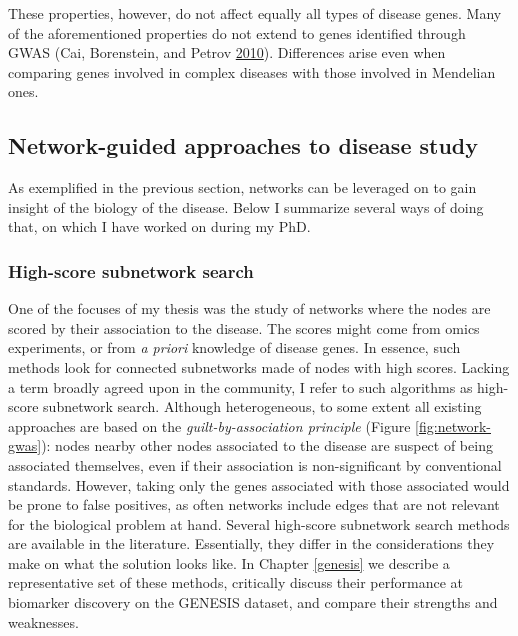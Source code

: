 \documentclass[
  11pt,
]{env/yjiao}
\begin{document}
These properties, however, do not affect equally all types of disease genes. Many of the aforementioned properties do not extend to genes identified through GWAS (Cai, Borenstein, and Petrov \protect\hyperlink{ref-cai_broker_2010}{2010}). Differences arise even when comparing genes involved in complex diseases with those involved in Mendelian ones.

\hypertarget{network-guided-approaches-to-disease-study}{%
\subsection{Network-guided approaches to disease study}\label{network-guided-approaches-to-disease-study}}

As exemplified in the previous section, networks can be leveraged on to gain insight of the biology of the disease. Below I summarize several ways of doing that, on which I have worked on during my PhD.

\hypertarget{intro-hs3}{%
\subsubsection{High-score subnetwork search}\label{intro-hs3}}

One of the focuses of my thesis was the study of networks where the nodes are scored by their association to the disease. The scores might come from omics experiments, or from \emph{a priori} knowledge of disease genes. In essence, such methods look for connected subnetworks made of nodes with high scores. Lacking a term broadly agreed upon in the community, I refer to such algorithms as high-score subnetwork search. Although heterogeneous, to some extent all existing approaches are based on the \emph{guilt-by-association principle} (Figure \ref{fig:network-gwas}): nodes nearby other nodes associated to the disease are suspect of being associated themselves, even if their association is non-significant by conventional standards. However, taking only the genes associated with those associated would be prone to false positives, as often networks include edges that are not relevant for the biological problem at hand. Several high-score subnetwork search methods are available in the literature. Essentially, they differ in the considerations they make on what the solution looks like. In Chapter \ref{genesis} we describe a representative set of these methods, critically discuss their performance at biomarker discovery on the GENESIS dataset, and compare their strengths and weaknesses.
\end{document}
